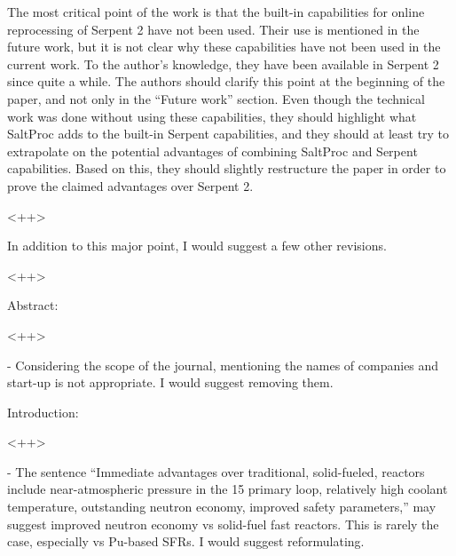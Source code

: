 \documentclass[answers,11pt]{exam}
\begin{document}
\begin{questions}

        \question The most critical point of the work is that the built-in 
        capabilities for online reprocessing of Serpent 2 have not been used. 
        Their use is mentioned in the future work, but it is not clear why 
        these capabilities have not been used in the current work. To the 
        author's knowledge, they have been available in Serpent 2 since quite a 
        while. The authors should clarify this point at the beginning of the 
        paper, and not only in the ``Future work'' section. Even though the 
        technical work was done without using these capabilities, they should 
        highlight what  SaltProc adds to the built-in Serpent capabilities, and 
        they should at least try to extrapolate on the potential advantages of 
        combining  SaltProc and Serpent capabilities. Based on this, they 
        should slightly restructure the paper in order to prove the claimed 
        advantages over Serpent 2.
        \begin{solution}
                <++>
        \end{solution}


        \question In addition to this major point, I would suggest a few other 
        revisions.
        \begin{solution}
                <++>
        \end{solution}


        \question Abstract:
        \begin{solution}
                <++>
        \end{solution}

        - Considering the scope of the journal, mentioning the names of 
        companies and start-up is not appropriate. I would suggest removing 
        them.

        \question Introduction:
        \begin{solution}
                <++>
        \end{solution}

        - The sentence ``Immediate advantages over traditional, solid-fueled, 
        reactors include near-atmospheric pressure in the 15 primary loop, 
        relatively high coolant temperature, outstanding neutron economy, 
        improved safety parameters,'' may suggest improved neutron economy vs 
        solid-fuel fast reactors. This is rarely the case, especially vs 
        Pu-based SFRs. I would suggest reformulating.


\end{questions}
\end{document}
